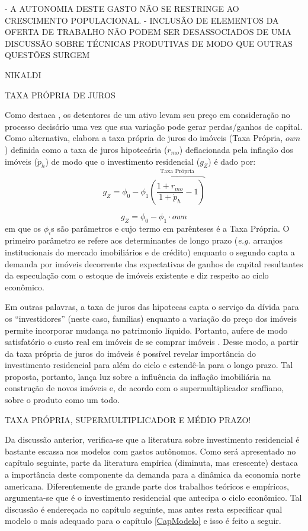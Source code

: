 - A AUTONOMIA DESTE GASTO NÃO SE RESTRINGE AO CRESCIMENTO POPULACIONAL.
- INCLUSÃO DE ELEMENTOS DA OFERTA DE TRABALHO NÃO PODEM SER DESASSOCIADOS DE UMA DISCUSSÃO SOBRE TÉCNICAS PRODUTIVAS DE MODO QUE OUTRAS QUESTÕES SURGEM

NIKALDI

TAXA PRÓPRIA DE JUROS

Como destaca \textcite[p.~53]{teixeira_crescimento_2015}, os detentores de um ativo levam seu preço em consideração no processo decisório uma vez que sua variação pode gerar perdas/ganhos de capital. Como alternativa, elabora a taxa própria de juros do imóveis (Taxa Própria, $own$) definida como a taxa de juros hipotecária ($r_{mo}$) deflacionada pela inflação dos imóveis ({$\dot p_h$}) de modo que o investimento residencial ($g_Z$) é dado por:
$$
g_Z = \phi_0 - \phi_1 \overbrace{\left(\frac{1+r_{mo}}{1+\dot p_h} - 1\right)}^{\text{Taxa Própria}}
$$

\begin{equation}
g_Z = \phi_0 - \phi_1\cdot own
\end{equation}
em que os $\phi_i$s são parâmetros e cujo termo em parênteses é a Taxa Própria. 
O primeiro parâmetro se refere aos determinantes de longo prazo (\textit{e.g.} arranjos institucionais do mercado imobiliários e de crédito) enquanto o segundo capta a demanda por imóveis decorrente das expectativas de ganhos de capital resultantes da especulação com o estoque de imóveis existente e diz respeito ao ciclo econômico.

Em outras palavras, a taxa de juros das hipotecas capta o serviço da dívida para os ``investidores'' (neste caso, famílias) enquanto a variação do preço dos imóveis permite incorporar mudança no patrimonio líquido. Portanto, aufere de modo satisfatório o custo real em imóveis de se comprar imóveis \cite[p.~53]{teixeira_crescimento_2015}. Desse modo, a partir da taxa própria de juros do imóveis é possível revelar importância do investimento residencial para além do ciclo e estendê-la para o longo prazo.  Tal proposta, portanto, lança luz sobre a influência da inflação imobiliária na construção de novos imóveis e, de acordo com o supermultiplicador sraffiano, sobre o produto como um todo. 


TAXA PRÓPRIA, SUPERMULTIPLICADOR E MÉDIO PRAZO!

Da discussão anterior, verifica-se que a literatura sobre investimento residencial é bastante escassa nos modelos com gastos autônomos. Como será apresentado no capítulo seguinte, parte da literatura empírica (diminuta, mas crescente) destaca a importância deste componente da demanda para a dinâmica da economia norte americana. Diferentemente de grande parte dos trabalhos teóricos e empíricos, argumenta-se que é o investimento residencial que antecipa o ciclo econômico. Tal discussão é endereçada no capítulo seguinte, mas antes resta especificar qual modelo o mais adequado para o capítulo \ref{CapModelo} e isso é feito a seguir.
